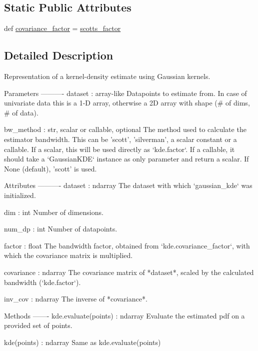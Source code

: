 \subsection*{Static Public Attributes}
\begin{DoxyCompactItemize}
\item 
def \hyperlink{classmatplotlib_1_1mlab_1_1GaussianKDE_ab360ecaf7d3eb1d7668174e7791c1c1a}{covariance\+\_\+factor} = \hyperlink{classmatplotlib_1_1mlab_1_1GaussianKDE_ac36963e4ffac27c198101dcdd2c9f59a}{scotts\+\_\+factor}
\end{DoxyCompactItemize}


\subsection{Detailed Description}
\begin{DoxyVerb}Representation of a kernel-density estimate using Gaussian kernels.

Parameters
----------
dataset : array-like
    Datapoints to estimate from. In case of univariate data this is a 1-D
    array, otherwise a 2D array with shape (# of dims, # of data).

bw_method : str, scalar or callable, optional
    The method used to calculate the estimator bandwidth.  This can be
    'scott', 'silverman', a scalar constant or a callable.  If a
    scalar, this will be used directly as `kde.factor`.  If a
    callable, it should take a `GaussianKDE` instance as only
    parameter and return a scalar. If None (default), 'scott' is used.

Attributes
----------
dataset : ndarray
    The dataset with which `gaussian_kde` was initialized.

dim : int
    Number of dimensions.

num_dp : int
    Number of datapoints.

factor : float
    The bandwidth factor, obtained from `kde.covariance_factor`, with which
    the covariance matrix is multiplied.

covariance : ndarray
    The covariance matrix of *dataset*, scaled by the calculated bandwidth
    (`kde.factor`).

inv_cov : ndarray
    The inverse of *covariance*.

Methods
-------
kde.evaluate(points) : ndarray
    Evaluate the estimated pdf on a provided set of points.

kde(points) : ndarray
    Same as kde.evaluate(points)\end{DoxyVerb}
 

